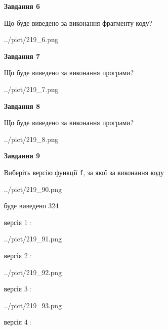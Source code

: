 \documentclass[12pt, ukrainian]{article}
\def\code#1{\Verb!#1!}
\begin{document}
{\begin {large}
{\begin {center}\textbf{Завдання 6}\end {center}}

Що буде виведено за виконання фрагменту коду?\par
\begin{center}
	{../pict/219_6.png}
\end{center}
\newpage

{\begin {center}\textbf{Завдання 7}\end {center}}

Що буде виведено за виконання програми?\par
\begin{center}
	{../pict/219_7.png}
\end{center}
\newpage

{\begin {center}\textbf{Завдання 8}\end {center}}

Що буде виведено за виконання програми?\par
\begin{center}
	{../pict/219_8.png}
\end{center}
\newpage

{\begin {center}\textbf{Завдання 9}\end {center}}

Виберіть версію функції \code{f}, за якої за виконання коду
\begin{center}
	{../pict/219_90.png}
\end{center}
буде виведено 324

\vspace{5mm}
версія 1 :

\begin{center}
	{../pict/219_91.png}
\end{center}
версія 2 :

\begin{center}
	{../pict/219_92.png}
\end{center}
версія 3 :

\begin{center}
	{../pict/219_93.png}
\end{center}
версія 4 :


\end{large}}
\end{document}
